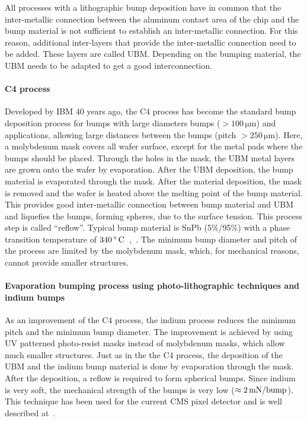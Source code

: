 All processes with a lithographic bump deposition have in common that the inter-metallic connection between the aluminum contact area of the chip and the bump material is not sufficient to establish an inter-metallic connection. For this reason, additional inter-layers that provide the inter-metallic connection need to be added. These layers are called \ac{UBM}. Depending on the bumping material, the \ac{UBM} needs to be adapted to get a good interconnection.



\paragraph*{\acl{C4} process}
Developed by IBM $40$ years ago, the \ac{C4} process has become the standard bump deposition process for bumps with large diameters bumps ($>100\,\si{\micro \meter}$) and applications, allowing large distances between the bumps (pitch $>250\,\si{\micro \meter}$). Here, a molybdenum mask covers all wafer surface, except for the metal pads where the bumps should be placed. Through the holes in the mask, the \ac{UBM} metal layers are grown onto the wafer by evaporation. After the \ac{UBM} deposition, the bump material is evaporated through the mask. After the material deposition, the mask is removed and the wafer is heated above the melting point of the bump material. This provides good inter-metallic connection between bump material and \ac{UBM} and liquefies the bumps, forming spheres, due to the surface tension. This process step is called ``reflow''. Typical bump material is SnPb (5$\%$/95$\%$) with a phase transition temperature of $340\,\rm{^\circ \, C}$~\cite {Ros06},~\cite{Mil69}. The minimum bump diameter and pitch of the process are limited by the molybdenum mask, which, for mechanical reasons, cannot provide smaller structures.

\paragraph*{Evaporation bumping process using photo-lithographic techniques and indium bumps}\label{sec:indium_bumping}
As an improvement of the \ac{C4} process, the indium process reduces the minimum pitch and the minimum bump diameter. The improvement is achieved by using UV patterned photo-resist masks instead of molybdenum masks, which allow much smaller structures. Just as in the the \ac{C4} process, the deposition of the \ac{UBM} and the indium bump material is done by evaporation through the mask. After the deposition, a reflow is required to form spherical bumps. Since indium is very soft, the mechanical strength of the bumps is very low ($\approx 2\,\rm{mN}/\rm{bump}$). This technique has been used for the current \ac{CMS} pixel detector and is well described at~\cite{Bro06}. 

